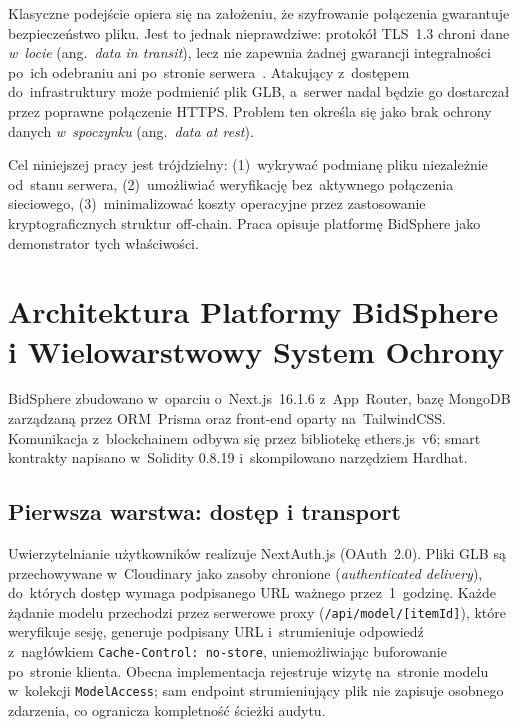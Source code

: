 \documentclass[10pt,conference,a4paper]{IEEEtran}
\begin{document}
Klasyczne podejście opiera się na założeniu, że szyfrowanie
połączenia gwarantuje bezpieczeństwo pliku. Jest to jednak
nieprawdziwe: protokół TLS~1.3 chroni dane \textit{w~locie}
(ang.~\textit{data in transit}), lecz nie zapewnia żadnej
gwarancji integralności po~ich odebraniu ani po~stronie
serwera~\cite{rfc8446}. Atakujący z~dostępem do~infrastruktury
może podmienić plik GLB, a~serwer nadal będzie go dostarczał
przez poprawne połączenie HTTPS. Problem ten określa się jako
brak ochrony danych \textit{w~spoczynku}
(ang.~\textit{data at rest}).

Cel niniejszej pracy jest trójdzielny: (1)~wykrywać podmianę
pliku niezależnie od~stanu serwera, (2)~umożliwiać weryfikację
bez~aktywnego połączenia sieciowego, (3)~minimalizować koszty
operacyjne przez zastosowanie kryptograficznych struktur
off-chain. Praca opisuje platformę BidSphere jako demonstrator
tych właściwości.

\section{Architektura Platformy BidSphere\\
         i Wielowarstwowy System Ochrony}

BidSphere zbudowano w~oparciu o~Next.js~16.1.6 z~App~Router, bazę
MongoDB zarządzaną przez ORM~Prisma oraz front-end oparty
na~TailwindCSS. Komunikacja z~blockchainem odbywa się przez
bibliotekę ethers.js~v6; smart kontrakty napisano w~Solidity
0.8.19 i~skompilowano narzędziem Hardhat.

\subsection{Pierwsza warstwa: dostęp i transport}

Uwierzytelnianie użytkowników realizuje NextAuth.js (OAuth~2.0).
Pliki GLB są przechowywane w~Cloudinary jako zasoby chronione
(\textit{authenticated delivery}), do~których dostęp wymaga
podpisanego URL ważnego przez~1~godzinę. Każde żądanie modelu
przechodzi przez serwerowe proxy (\texttt{/api/model/{[}itemId{]}}),
które weryfikuje sesję, generuje podpisany URL i~strumieniuje
odpowiedź z~nagłówkiem \texttt{Cache-Control: no-store},
uniemożliwiając buforowanie po~stronie klienta. Obecna implementacja
rejestruje wizytę na~stronie modelu w~kolekcji \texttt{ModelAccess};
sam endpoint strumieniujący plik nie zapisuje osobnego zdarzenia,
co ogranicza kompletność ścieżki audytu.
\end{document}

